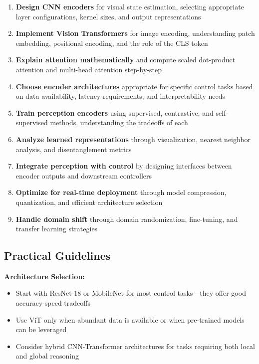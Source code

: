 \begin{enumerate}
    \item \textbf{Design CNN encoders} for visual state estimation, selecting appropriate layer configurations, kernel sizes, and output representations

    \item \textbf{Implement Vision Transformers} for image encoding, understanding patch embedding, positional encoding, and the role of the CLS token

    \item \textbf{Explain attention mathematically} and compute scaled dot-product attention and multi-head attention step-by-step

    \item \textbf{Choose encoder architectures} appropriate for specific control tasks based on data availability, latency requirements, and interpretability needs

    \item \textbf{Train perception encoders} using supervised, contrastive, and self-supervised methods, understanding the tradeoffs of each

    \item \textbf{Analyze learned representations} through visualization, nearest neighbor analysis, and disentanglement metrics

    \item \textbf{Integrate perception with control} by designing interfaces between encoder outputs and downstream controllers

    \item \textbf{Optimize for real-time deployment} through model compression, quantization, and efficient architecture selection

    \item \textbf{Handle domain shift} through domain randomization, fine-tuning, and transfer learning strategies
\end{enumerate}

\subsection{Practical Guidelines}

\textbf{Architecture Selection:}
\begin{itemize}
    \item Start with ResNet-18 or MobileNet for most control tasks---they offer good accuracy-speed tradeoffs
    \item Use ViT only when abundant data is available or when pre-trained models can be leveraged
    \item Consider hybrid CNN-Transformer architectures for tasks requiring both local and global reasoning
\end{itemize}

